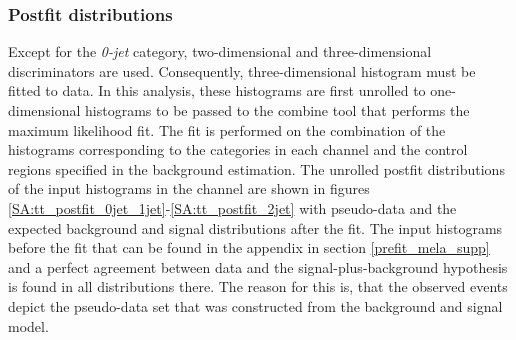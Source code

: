 \subsubsection{Postfit distributions}
Except for the \textit{0-jet} category, two-dimensional and three-dimensional discriminators are used. Consequently, three-dimensional histogram must be fitted to data. In this analysis, these histograms are first unrolled to one-dimensional histograms to be passed to the combine tool that performs the maximum likelihood fit. 
The fit is performed on the combination of the histograms corresponding to the categories in each channel and the control regions specified in the background estimation.
The unrolled postfit distributions of the input histograms in the \tautau{} channel are shown in figures \ref{SA:tt_postfit_0jet_1jet}-\ref{SA:tt_postfit_2jet} with pseudo-data and the expected background and signal distributions after the fit. The input histograms before the fit that can be found in the appendix in section \ref{prefit_mela_supp} and a 
perfect agreement between data and the signal-plus-background hypothesis is found in all distributions there. The reason for this is, that the observed events depict the pseudo-data set that was constructed from the background and signal model.\newline

